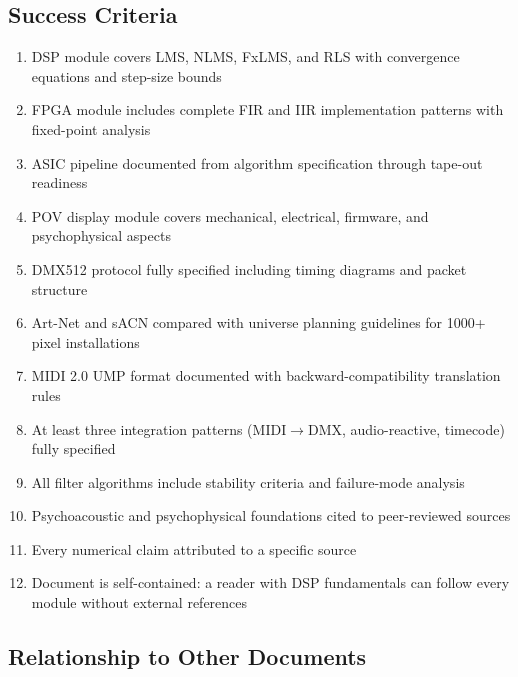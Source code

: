 \documentclass[11pt,letterpaper]{article}
\begin{document}
\subsection{Success Criteria}

\begin{enumerate}[leftmargin=2em]
\item DSP module covers LMS, NLMS, FxLMS, and RLS with convergence equations and step-size bounds
\item FPGA module includes complete FIR and IIR implementation patterns with fixed-point analysis
\item ASIC pipeline documented from algorithm specification through tape-out readiness
\item POV display module covers mechanical, electrical, firmware, and psychophysical aspects
\item DMX512 protocol fully specified including timing diagrams and packet structure
\item Art-Net and sACN compared with universe planning guidelines for 1000+ pixel installations
\item MIDI 2.0 UMP format documented with backward-compatibility translation rules
\item At least three integration patterns (MIDI$\to$DMX, audio-reactive, timecode) fully specified
\item All filter algorithms include stability criteria and failure-mode analysis
\item Psychoacoustic and psychophysical foundations cited to peer-reviewed sources
\item Every numerical claim attributed to a specific source
\item Document is self-contained: a reader with DSP fundamentals can follow every module without external references
\end{enumerate}

\subsection{Relationship to Other Documents}
\end{document}
